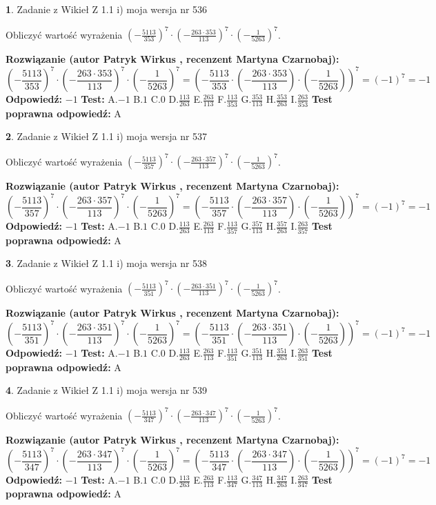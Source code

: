 \documentclass[12pt, a4paper]{article}
\theoremstyle{definition} %
\newtheorem{zad}{}
\newcommand{\zadStart}[1]{\begin{zad}#1\newline}
\newcommand{\zadStop}{\end{zad}}
\newcommand{\rozwStart}[2]{\noindent \textbf{Rozwiązanie (autor #1 , recenzent #2): }\newline}
\newcommand{\rozwStop}{\newline}
\newcommand{\odpStart}{\noindent \textbf{Odpowiedź:}\newline}
\newcommand{\odpStop}{\newline}
\newcommand{\testStart}{\noindent \textbf{Test:}\newline}
\newcommand{\testStop}{\newline}
\newcommand{\kluczStart}{\noindent \textbf{Test poprawna odpowiedź:}\newline}
\newcommand{\kluczStop}{\newline}
\begin{document}
\zadStart{Zadanie z Wikieł Z 1.1 i) moja wersja nr 536}

Obliczyć wartość wyrażenia $(-\frac{5113}{353})^{7} \cdot (-\frac{263 \cdot 353}{113})^{7} \cdot (-\frac{1}{5263})^{7}$.
\zadStop
\rozwStart{Patryk Wirkus}{Martyna Czarnobaj}
$$(-\frac{5113}{353})^{7} \cdot (-\frac{263 \cdot 353}{113})^{7} \cdot (-\frac{1}{5263})^{7} = (-\frac{5113}{353} \cdot (-\frac{263 \cdot 353}{113}) \cdot (-\frac{1}{5263}))^{7} = (-1)^{7} = -1$$
\rozwStop
\odpStart
$-1$
\odpStop
\testStart
A.$-1$ B.$1$ C.$0$ D.$\frac{113}{263}$ E.$\frac{263}{113}$
F.$\frac{113}{353}$ G.$\frac{353}{113}$
H.$\frac{353}{263}$
I.$\frac{263}{353}$
\testStop
\kluczStart
A
\kluczStop



\zadStart{Zadanie z Wikieł Z 1.1 i) moja wersja nr 537}

Obliczyć wartość wyrażenia $(-\frac{5113}{357})^{7} \cdot (-\frac{263 \cdot 357}{113})^{7} \cdot (-\frac{1}{5263})^{7}$.
\zadStop
\rozwStart{Patryk Wirkus}{Martyna Czarnobaj}
$$(-\frac{5113}{357})^{7} \cdot (-\frac{263 \cdot 357}{113})^{7} \cdot (-\frac{1}{5263})^{7} = (-\frac{5113}{357} \cdot (-\frac{263 \cdot 357}{113}) \cdot (-\frac{1}{5263}))^{7} = (-1)^{7} = -1$$
\rozwStop
\odpStart
$-1$
\odpStop
\testStart
A.$-1$ B.$1$ C.$0$ D.$\frac{113}{263}$ E.$\frac{263}{113}$
F.$\frac{113}{357}$ G.$\frac{357}{113}$
H.$\frac{357}{263}$
I.$\frac{263}{357}$
\testStop
\kluczStart
A
\kluczStop



\zadStart{Zadanie z Wikieł Z 1.1 i) moja wersja nr 538}

Obliczyć wartość wyrażenia $(-\frac{5113}{351})^{7} \cdot (-\frac{263 \cdot 351}{113})^{7} \cdot (-\frac{1}{5263})^{7}$.
\zadStop
\rozwStart{Patryk Wirkus}{Martyna Czarnobaj}
$$(-\frac{5113}{351})^{7} \cdot (-\frac{263 \cdot 351}{113})^{7} \cdot (-\frac{1}{5263})^{7} = (-\frac{5113}{351} \cdot (-\frac{263 \cdot 351}{113}) \cdot (-\frac{1}{5263}))^{7} = (-1)^{7} = -1$$
\rozwStop
\odpStart
$-1$
\odpStop
\testStart
A.$-1$ B.$1$ C.$0$ D.$\frac{113}{263}$ E.$\frac{263}{113}$
F.$\frac{113}{351}$ G.$\frac{351}{113}$
H.$\frac{351}{263}$
I.$\frac{263}{351}$
\testStop
\kluczStart
A
\kluczStop



\zadStart{Zadanie z Wikieł Z 1.1 i) moja wersja nr 539}

Obliczyć wartość wyrażenia $(-\frac{5113}{347})^{7} \cdot (-\frac{263 \cdot 347}{113})^{7} \cdot (-\frac{1}{5263})^{7}$.
\zadStop
\rozwStart{Patryk Wirkus}{Martyna Czarnobaj}
$$(-\frac{5113}{347})^{7} \cdot (-\frac{263 \cdot 347}{113})^{7} \cdot (-\frac{1}{5263})^{7} = (-\frac{5113}{347} \cdot (-\frac{263 \cdot 347}{113}) \cdot (-\frac{1}{5263}))^{7} = (-1)^{7} = -1$$
\rozwStop
\odpStart
$-1$
\odpStop
\testStart
A.$-1$ B.$1$ C.$0$ D.$\frac{113}{263}$ E.$\frac{263}{113}$
F.$\frac{113}{347}$ G.$\frac{347}{113}$
H.$\frac{347}{263}$
I.$\frac{263}{347}$
\testStop
\kluczStart
A
\kluczStop
\end{document}
